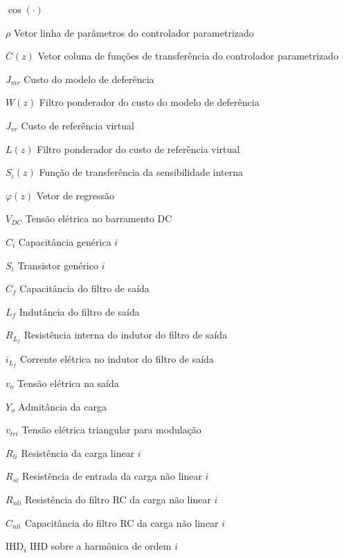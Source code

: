 \documentclass[repeatfields,oneside]{tcc}
\newcommand{\myoC}[2][]{ \overline{C_{#1}} \left( #2 \right) }
\begin{document}
\begin{listofsymbols}{$ \cos(\cdot) $}
    \item[$ \rho $] Vetor linha de parâmetros do controlador parametrizado
    \item[$ \myoC{z} $] Vetor coluna de funções de transferência do controlador parametrizado

    \item[$ J_{mr} $] Custo do modelo de deferência
    \item[$ W(z) $] Filtro ponderador do custo do modelo de deferência

    \item[$ J_{vr} $] Custo de referência virtual
    \item[$ L(z) $] Filtro ponderador do custo de referência virtual

    \item[$ S_i(z) $] Função de transferência da sensibilidade interna

    \item[$ \varphi(z) $] Vetor de regressão


    \item[$ V_{DC} $] Tensão elétrica no barramento DC

    \item[$ C_i $] Capacitância genérica $i$
    \item[$ S_i $] Transistor genérico $i$

    \item[$ C_f $] Capacitância do filtro de saída
    \item[$ L_f $] Indutância do filtro de saída
    \item[$ R_{L_f} $] Resistência interna do indutor do filtro de saída

    \item[$ i_{L_f} $] Corrente elétrica no indutor do filtro de saída
    \item[$ v_o $] Tensão elétrica na saída

    \item[$ Y_o $] Admitância da carga

    \item[$ v_{tri} $] Tensão elétrica triangular para modulação

    \item[$ R_{li} $] Resistência da carga linear $i$

    \item[$ R_{si} $] Resistência de entrada da carga não linear $i$
    \item[$ R_{nli} $] Resistência do filtro RC da carga não linear $i$
    \item[$ C_{nli} $] Capacitância do filtro RC da carga não linear $i$


    \item[IHD\textsubscript{$i$}] IHD sobre a harmônica de ordem $i$

\end{listofsymbols}
\end{document}
